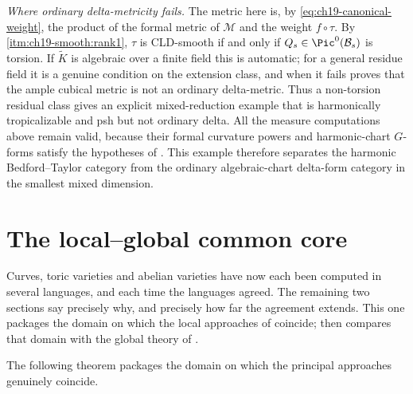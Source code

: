 \begin{example}
\emph{Where ordinary delta-metricity fails.}  The metric here is, by
\eqref{eq:ch19-canonical-weight}, the product of the formal metric of
$\mathcal M$ and the weight $f\circ\tau$.  By
\,\cref{itm:ch19-smooth:rank1}, $\tau$ is
CLD-smooth if and only if $Q_s\in\Pic^0(\mathcal B_s)$ is torsion.  If
$\widetilde K$ is algebraic over a finite field this is automatic; for a
general residue field it is a genuine condition on the extension class, and
when it fails  proves that the ample
cubical metric is not an ordinary delta-metric.  Thus a non-torsion residual
class gives an explicit mixed-reduction example that is harmonically
tropicalizable and psh but not ordinary delta.  All the measure computations
above remain valid, because their formal curvature powers and
harmonic-chart $G$-forms satisfy the hypotheses of
.  This example therefore separates the
harmonic Bedford--Taylor category from the ordinary algebraic-chart
delta-form category in the smallest mixed dimension.
\end{example}

\section{The local--global common core}
\label{sec:ch19-common-core}

Curves, toric varieties and abelian varieties have now each been computed in
several languages, and each time the languages agreed.  The remaining two
sections say precisely why, and precisely how far the agreement extends.
This one packages the domain on which the local approaches of
 coincide;  then compares that domain
with the global theory of .

The following theorem packages the domain on which the principal
approaches genuinely coincide.

